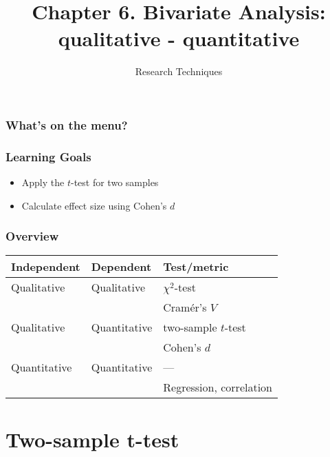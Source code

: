 \documentclass[aspectratio=169]{beamer}
\title{Chapter 6. Bivariate Analysis: qualitative - quantitative}
\subtitle{Research Techniques}
\begin{document}
\begin{frame}
  \maketitle
\end{frame}

\begin{frame}
  \frametitle{What's on the menu?}
  
  \tableofcontents
\end{frame}

\begin{frame}
  \frametitle{Learning Goals}
  
  \begin{itemize}
    \item Apply the $t$-test for two samples
    \item Calculate effect size using Cohen's $d$
  \end{itemize}
\end{frame}

\begin{frame}
  \frametitle{Overview}
  \centering
  \begin{tabular}{lll}
    \toprule
    \textbf{Independent} & \textbf{Dependent} & \textbf{Test/metric}        \\
    \midrule
    Qualitative             & Qualitative           & $\chi^2$-test                 \\
    &                       & Cramér's $V$                  \\
    Qualitative             & Quantitative          & two-sample $t$-test           \\
    &                       & Cohen's $d$                   \\
    Quantitative            & Quantitative          & ---                           \\
    &                       & Regression, correlation       \\
    \bottomrule
  \end{tabular}
\end{frame}

\section{Two-sample t-test}
\end{document}
